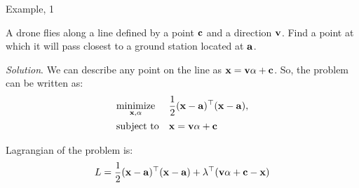 \documentclass{beamer}
\begin{document}
\begin{frame}{Example, 1}
	\begin{flushleft}
		
		A drone flies along a line defined by a point $\mathbf{c}$ and a direction $\mathbf{v}$. Find a point at which it will pass closest to a ground station located at $\mathbf{a}$.
		
		\bigskip
		
		\emph{Solution}. We can describe any point on the line as $\mathbf{x} = \mathbf{v} \alpha + \mathbf{c}$. So, the problem can be written as:
		\begin{equation}
			\begin{aligned}
				& \underset{\mathbf{x}, \alpha}{\text{minimize}}
				& & \frac{1}{2}(\mathbf{x}- \mathbf{a})^\top(\mathbf{x}- \mathbf{a}), \\
				& \text{subject to}
				& & \mathbf{x} = \mathbf{v} \alpha + \mathbf{c}
			\end{aligned}
		\end{equation}
		
		Lagrangian of the problem is:
		\begin{equation}
			L =  \frac{1}{2}(\mathbf{x}- \mathbf{a})^\top(\mathbf{x}- \mathbf{a}) + \lambda^\top  ( \mathbf{v} \alpha + \mathbf{c} - \mathbf{x})
		\end{equation}
		
	
		
	\end{flushleft}
\end{frame}
\end{document}
